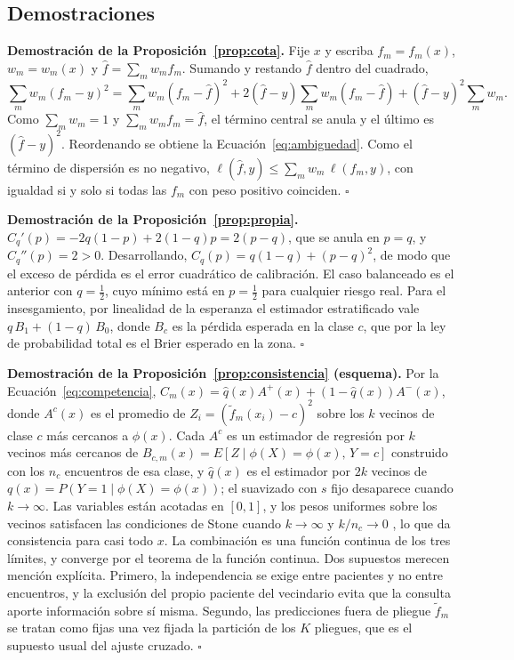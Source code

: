 \documentclass[pdflatex,sn-mathphys-num]{sn-jnl}
\theoremstyle{plain}
\begin{document}
\begin{appendices}

\section{Demostraciones}\label{app:demostraciones}

\textbf{Demostración de la Proposición~\ref{prop:cota}.} Fije $x$ y escriba $f_m=f_m(x)$, $w_m=w_m(x)$ y $\hat{f}=\sum_m w_m f_m$. Sumando y restando $\hat{f}$ dentro del cuadrado,
\begin{equation*}
\sum_{m} w_m (f_m - y)^2 = \sum_{m} w_m (f_m - \hat{f})^2 + 2(\hat{f}-y)\sum_{m} w_m (f_m - \hat{f}) + (\hat{f}-y)^2 \sum_m w_m .
\end{equation*}
Como $\sum_m w_m = 1$ y $\sum_m w_m f_m = \hat{f}$, el término central se anula y el último es $(\hat{f}-y)^2$. Reordenando se obtiene la Ecuación~\eqref{eq:ambiguedad}. Como el término de dispersión es no negativo, $\ell(\hat{f},y)\leq\sum_m w_m\,\ell(f_m,y)$, con igualdad si y solo si todas las $f_m$ con peso positivo coinciden. \hfill$\square$

\textbf{Demostración de la Proposición~\ref{prop:propia}.} $C_q'(p)=-2q(1-p)+2(1-q)p=2(p-q)$, que se anula en $p=q$, y $C_q''(p)=2>0$. Desarrollando, $C_q(p)=q(1-q)+(p-q)^2$, de modo que el exceso de pérdida es el error cuadrático de calibración. El caso balanceado es el anterior con $q=\tfrac{1}{2}$, cuyo mínimo está en $p=\tfrac{1}{2}$ para cualquier riesgo real. Para el insesgamiento, por linealidad de la esperanza el estimador estratificado vale $q\,B_1+(1-q)\,B_0$, donde $B_c$ es la pérdida esperada en la clase $c$, que por la ley de probabilidad total es el Brier esperado en la zona. \hfill$\square$

\textbf{Demostración de la Proposición~\ref{prop:consistencia} (esquema).} Por la Ecuación~\eqref{eq:competencia}, $C_m(x)=\hat{q}(x)A^{+}(x)+(1-\hat{q}(x))A^{-}(x)$, donde $A^{c}(x)$ es el promedio de $Z_i=(\tilde{f}_m(x_i)-c)^2$ sobre los $k$ vecinos de clase $c$ más cercanos a $\phi(x)$. Cada $A^{c}$ es un estimador de regresión por $k$ vecinos más cercanos de $B_{c,m}(x)=E[Z\mid\phi(X)=\phi(x),\,Y=c]$ construido con los $n_c$ encuentros de esa clase, y $\hat{q}(x)$ es el estimador por $2k$ vecinos de $q(x)=P(Y=1\mid\phi(X)=\phi(x))$; el suavizado con $s$ fijo desaparece cuando $k\to\infty$. Las variables están acotadas en $[0,1]$, y los pesos uniformes sobre los vecinos satisfacen las condiciones de Stone cuando $k\to\infty$ y $k/n_c\to 0$ \cite{bib_stone_1977}, lo que da consistencia para casi todo $x$. La combinación es una función continua de los tres límites, y converge por el teorema de la función continua. Dos supuestos merecen mención explícita. Primero, la independencia se exige entre pacientes y no entre encuentros, y la exclusión del propio paciente del vecindario evita que la consulta aporte información sobre sí misma. Segundo, las predicciones fuera de pliegue $\tilde{f}_m$ se tratan como fijas una vez fijada la partición de los $K$ pliegues, que es el supuesto usual del ajuste cruzado. \hfill$\square$


\end{appendices}
\end{document}
